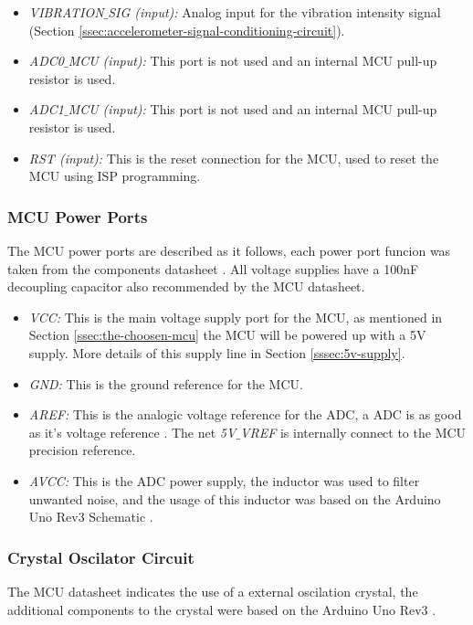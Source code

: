 \begin{itemize}
					\item \textit{VIBRATION$\_$SIG (input):} Analog input for the vibration intensity signal (Section \ref{ssec:accelerometer-signal-conditioning-circuit}).\label{itm:mcu-port-vibration-sig}
					\item \textit{ADC0$\_$MCU (input):} This port is not used and an internal MCU pull-up resistor is used.\label{itm:mcu-port-adc0-mcu}
					\item \textit{ADC1$\_$MCU (input):} This port is not used and an internal MCU pull-up resistor is used.\label{itm:mcu-port-adc1-mcu}
					\item \textit{RST (input):} This is the reset connection for the MCU, used to reset the MCU using ISP programming.\label{itm:mcu-port-rst}
				\end{itemize}
		
			\subsubsection{MCU Power Ports}\label{sssec:mcu-power-ports}
				The MCU power ports are described as it follows, each power port funcion was taken from the components datasheet \cite{atmega328p-datasheet}. All voltage supplies have a 100nF decoupling capacitor also recommended by the MCU datasheet.

				\begin{itemize}
					\item \textit{VCC: } This is the main voltage supply port for the MCU, as mentioned in Section \ref {ssec:the-choosen-mcu} the MCU will be powered up with a 5V supply. More details of this supply line in Section \ref{sssec:5v-supply}.\label{itm:mcu-vcc}
					\item \textit{GND: } This is the ground reference for the MCU.\label{itm:mcu-gnd}
					\item \textit{AREF: } This is the analogic voltage reference for the ADC, a ADC is as good as it's voltage reference \cite{adc-good}. The net \textit{5V$\_$VREF} is internally connect to the MCU precision reference.
					\item \textit{AVCC: } This is the ADC power supply, the inductor was used to filter unwanted noise, and the usage of this inductor was based on the Arduino Uno Rev3 Schematic \cite{arduino-rev3-schematic}.\label{mcu-avcc}
				\end{itemize}

			\subsubsection{Crystal Oscilator Circuit}\label{sssec:mcu-crystal-oscilator}

				The MCU datasheet indicates the use of a external oscilation crystal, the additional components to the crystal were based on the Arduino Uno Rev3 \cite{arduino-rev3-schematic}.